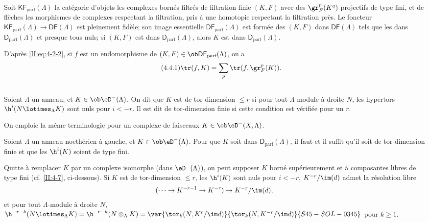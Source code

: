 Soit $\mathsf{KF}_\text{parf}(\Lambda)$ la catégorie d'objets les complexes 
bornés filtrés de filtration finie $(K,F)$ avec des $\gr_F^p(K^q)$ projectifs 
de type fini, et de flèches les morphismes de complexes respectant la 
filtration, pris à une homotopie respectant la filtration près. Le foncteur 
$\mathsf{KF}_\text{parf}(\Lambda)\to\mathsf{DF}(\Lambda)$ est pleinement fidèle; 
son image essentielle $\mathsf{DF}_\text{parf}(\Lambda)$ est formée des $(K,F)$ dans 
$\mathsf{DF}(\Lambda)$ tels que les  dans 
$\mathsf{D}_\text{parf}(\Lambda)$ et presque tous nuls; si $(K,F)$ est dans $\mathsf{D}_\text{parf}(\Lambda)$, alors $K$ est dans 
$\mathsf{D}_\text{parf}(\Lambda)$. 

D'après \eqref{II:eq:4-2-2}, si $f$ est un endomorphisme de 
$(K,F)\in\ob\mathsf{DF}_\text{parf}(\Lambda)$, on a 
\begin{equation*}\tag{4.4.1}\label{II:eq:4-4-1}
 \tr(f,K) = \sum_p \tr(f,\gr_F^p(K)) \text{.}
\end{equation*}





\subsection{}\label{II:4-5}

Soient $\Lambda$ un anneau, et $K\in\ob\eD^-(\Lambda)$. On dit que $K$ est de 
tor-dimension $\leqslant r$ si pour tout $\Lambda$-module à droite $N$, les 
hypertors $\h^i(N\lotimes_\Lambda K)$ sont nuls pour $i<-r$. Il est dit de 
tor-dimension finie si cette condition est vérifiée pour un $r$. 

On emploie la même terminologie pour un complexe de faisceaux 
$K\in\ob\eD^-(X,\Lambda)$. 





\begin{lemma}\label{II:4-5-1} 
Soient $\Lambda$ un anneau noethérien à gauche, et $K\in\ob\eD^-(\Lambda)$. 
Pour que $K$ soit dans $\mathsf{D}_\text{parf}(\Lambda)$, il faut et il suffit 
qu'il soit de tor-dimension finie et que les $\h^i(K)$ soient de type fini.
\end{lemma}

Quitte à remplacer $K$ par un complexe isomorphe (dans $\eD^-(\Lambda)$), on 
peut supposer $K$ borné supérieurement et à composantes libres de type 
fini (cf. \ref{II:4-7}, ci-dessous). Si $K$ est de tor-dimension $\leqslant r$, 
les $\h^i(K)$ sont nuls pour $i<-r$, $K^{-r}/\im(d)$ admet la résolution 
libre 
\[
  (\cdots \to K^{-r-1} \to K^{-r}) \to K^{-r}/\im(d) \text{,}
\]
et pour tout $\Lambda$-module à droite $N$, 
$\h^{-r-k}(N\lotimes_\Lambda K) = \h^{-r-k}(N\otimes_\Lambda K) 
= \var{\tor_k(N,K^r/\im d)}{\tor_k(N,K^{-r}/\im d)}{S45-SOL-0345}$ pour $k\geqslant 1$. 


